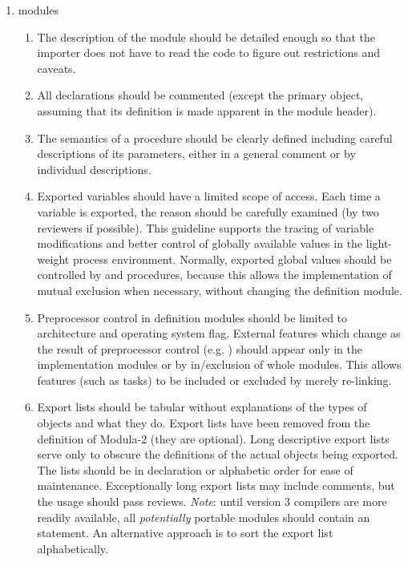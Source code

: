 \begin{enumerate}
\begin{enumerate}
    \end{enumerate}
\item
     modules 
    \begin{enumerate}
    \item
        The description of the module should be detailed enough so that the
        importer does not have to read the code to figure out restrictions
        and caveats.
    \item
        All declarations should be commented (except the primary object,
        assuming that its definition is made apparent in the module header).
    \item
        The semantics of a procedure should be clearly defined including
        careful descriptions of its parameters, either in a general comment
        or by individual descriptions.
    \item
        Exported variables should have a limited scope of access.
        Each time a variable is exported, the reason should be carefully 
        examined (by two reviewers if possible).  This guideline supports the 
	tracing of variable modifications and better control of globally 
	available values in the light-weight
	process environment.  Normally,
	exported global values should be controlled by  
	and  procedures, because this allows the implementation of
	mutual exclusion when necessary, without changing the definition
	module.
    \item
        Preprocessor control in definition modules should be limited to
        architecture and operating system flag.  External features
        which change as the result of preprocessor control (e.g. )
        should appear only in the implementation modules or by in/exclusion
        of whole modules. This allows features (such as tasks) to be included
        or excluded by merely re-linking.
    \item
        Export lists should be tabular without explanations of the 
        types of objects and what they do.  Export lists have been removed from
        the definition of Modula-2 (they are optional).  Long descriptive export
        lists serve only to obscure the definitions of the actual objects being
        exported.  The lists should be in declaration or alphabetic order
	for ease of maintenance.  Exceptionally long export
        lists may include comments, but the usage should pass reviews.
        {\em Note}: until version 3 compilers are more readily available, all
        {\em potentially} portable modules should contain an 
	 statement.  An alternative approach is to sort
	the export list alphabetically.


\end{enumerate}
\end{enumerate}
